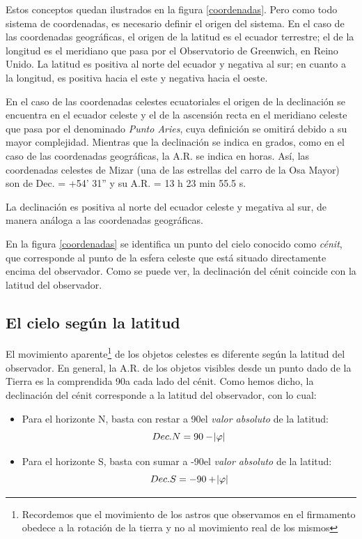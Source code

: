 \documentclass[11pt,a5paper,twoside]{amsbook}
\begin{document}
Estos conceptos quedan ilustrados en la figura \ref{coordenadas}. Pero como todo sistema de coordenadas, es necesario definir el origen del sistema. En el caso de las coordenadas geográficas, el origen de la latitud es el ecuador terrestre; el de la longitud es el meridiano que pasa por el Observatorio de Greenwich, en Reino Unido. La latitud es positiva al norte del ecuador y negativa al sur; en cuanto a la longitud, es positiva hacia el este y negativa hacia el oeste.

En el caso de las coordenadas celestes ecuatoriales el origen de la declinación se encuentra en el ecuador celeste y el de la ascensión recta en el meridiano celeste que pasa por el denominado \textit{Punto Aries}, cuya definición se omitirá debido a su mayor complejidad. Mientras que la declinación se indica en grados, como en el caso de las coordenadas geográficas, la A.R. se indica en horas. Así, las coordenadas celestes de Mizar (una de las estrellas del carro de la Osa Mayor) son de Dec. = +54' 31'' y su A.R. = 13 h 23 min 55.5 s.

La declinación es positiva al norte del ecuador celeste y megativa al sur, de manera análoga a las coordenadas geográficas.

En la figura \ref{coordenadas} se identifica un punto del cielo conocido como \textit{cénit}, que corresponde al punto de la esfera celeste que está situado directamente encima del observador. Como se puede ver, la declinación del cénit coincide con la latitud del observador.

\subsection{El cielo según la latitud}


El movimiento aparente\footnote{Recordemos que el movimiento de los astros que observamos en el firmamento obedece a la rotación de la tierra y no al movimiento real de los mismos} de los objetos celestes es diferente según la latitud del observador. En general, la A.R. de los objetos visibles desde un punto dado de la Tierra es la comprendida 90\textdegree a cada lado del cénit. Como hemos dicho, la declinación del cénit corresponde a la latitud del observador, con lo cual:

\begin{itemize}
 \item Para el horizonte N, basta con restar a 90\textdegree el \textit{valor absoluto} de la latitud:
 \[Dec. N = 90 - \abs{\varphi}\]
 \item Para el horizonte S, basta con sumar a -90\textdegree el \textit{valor absoluto} de la latitud:
 \[Dec. S = -90 + \abs{\varphi}\]
\end{itemize}
\end{document}
